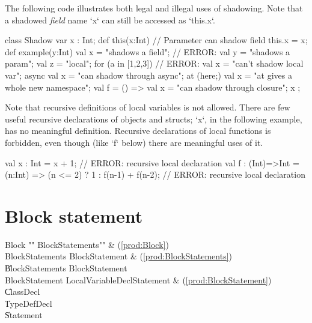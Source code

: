 \begin{ex}
The following code illustrates both legal and illegal uses of shadowing.
Note that a shadowed {\em field} name \xcd`x` can still be accessed 
as \xcd`this.x`. 
\begin{xten}
class Shadow{
  var x : Int; 
  def this(x:Int) { 
     // Parameter can shadow field
     this.x = x; 
  }
  def example(y:Int) {
     val x = "shadows a field";
     // ERROR: val y = "shadows a param";
     val z = "local";
     for (a in [1,2,3]) {
        // ERROR: val x = "can't shadow local var";
     }
     async {
        val x = "can shadow through async";
     }        
     at (here;) {
        val x = "at gives a whole new namespace";
     }        
     val f = () => { 
       val x = "can shadow through closure";
       x
     };
  }
}
\end{xten}
%
\end{ex}

\begin{ex}
Note that recursive definitions of local variables is not allowed.  There are
few useful recursive declarations of objects and structs; \xcd`x`, in the
following example, has no meaningful definition.  Recursive declarations of
local functions is forbidden, even though (like \xcd`f` below) there are
meaningful uses of it.  
\begin{xten}
val x : Int = x + 1; // ERROR: recursive local declaration
val f : (Int)=>Int 
      = (n:Int) => (n <= 2) ? 1 : f(n-1) + f(n-2);
      // ERROR: recursive local declaration
\end{xten}

\end{ex}



\section{Block statement}
\label{Blocks}

\begin{bbgrammar}
               Block \: \xcd"{" BlockStatements\opt \xcd"}" & (\ref{prod:Block}) \\
     BlockStatements \: BlockStatement & (\ref{prod:BlockStatements}) \\
                    \| BlockStatements BlockStatement \\
      BlockStatement \: LocalVariableDeclStatement & (\ref{prod:BlockStatement}) \\
                    \| ClassDecl \\
                    \| TypeDefDecl \\
                    \| Statement \\
\end{bbgrammar}



